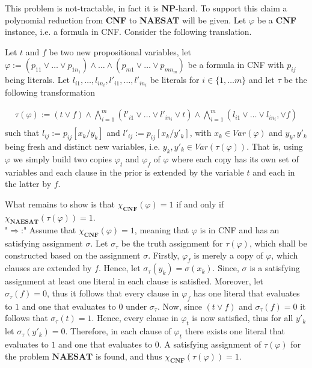 \documentclass[11pt,a4paper]{article}
\newcommand{\NP}{\ensuremath{\mathbf{NP}}\xspace}
\begin{document}
\begin{enumerate}
\begin{itemize}
        
        
This problem is not-tractable, in fact it is \NP-hard. To support this claim a polynomial reduction from \textbf{CNF} to \textbf{NAESAT} will be given. Let $\varphi$ be a \textbf{CNF} instance, i.e. a formula in CNF. Consider the following translation.  

Let $t$ and $f$ be two new propositional variables, let $\varphi:= (p_{11} \lor \dots \lor p_{1n_1}) \land \dots  \land (p_{m1} \lor \dots \lor p_{mn_m})  $ be a formula in CNF with $p_{ij}$ being literals. Let $l_{i1} , \dots , l_{in_i}, l'_{i1} , \dots , l'_{in_i}$ be literals for $i \in \{1, \dots m\}$ and let $\tau$ be the following transformation

\begin{equation*}
\begin{split}
\tau(\varphi) := (t \lor f) \land  \bigwedge_{i =1}^{m}  (l'_{i1} \lor \dots \lor l'_{in_i} \lor t)  \land \bigwedge_{i =1}^{m}    (l_{i1} \lor \dots \lor l_{in_i}, \lor f) \\
\end{split}
\end{equation*}
such that $l_{ij}:=p_{ij}[x_k/y_k]$ and $l'_{ij}:=p_{ij}[x_k/y'_k]$, with $x_k \in Var(\varphi)$ and $y_k, y'_k$ being fresh and distinct new variables, i.e. $y_k, y'_k \in \mathit{Var}(\tau(\varphi))$.
That is, using $\varphi$ we simply build two copies $\varphi_t$ and $\varphi_f$ of $\varphi$ where each copy has its own set of variables and each clause in the prior is extended by the variable $t$ and each in the latter by $f$.


What remains to show is that $\chi_{\textbf{CNF}}(\varphi) = 1$ if and only if $\chi_{\textbf{NAESAT}}(\tau(\varphi)) = 1$. \\

"$\Rightarrow$:" Assume that $\chi_{\textbf{CNF}}(\varphi) = 1$, meaning that $\varphi$ is in CNF and has an satisfying assignment $\sigma$. Let $\sigma_{\tau}$ be the truth assignment for $\tau(\varphi)$, which shall be constructed based on the assignment $\sigma$. 
Firstly, $\varphi_f$ is merely a copy of $\varphi$, which clauses are extended by $f$. Hence, let $\sigma_{\tau}(y_k)=\sigma(x_k)$. Since, $\sigma$ is a satisfying assignment at least one literal in each clause is  satisfied. Moreover, let $\sigma_{\tau}(f)=0$, thus it follows that every clause in $\varphi_f$ has one literal that evaluates to $1$  and one that evaluates to $0$ under $\sigma_{\tau}$. Now, since $(t \lor f)$ and $\sigma_{\tau}(f)=0$ it follows that $\sigma_{\tau}(t)=1$. Hence, every clause in $\varphi_t$ is now satisfied, thus for all $y'_k$ let $\sigma_{\tau}(y'_k)=0$. Therefore, in each clause of $\varphi_t$ there exists one literal that evaluates to $1$ and one that evaluates to $0$.
A satisfying assignment of $\tau(\varphi)$ for the problem $\textbf{NAESAT}$ is found, and thus $\chi_{\textbf{CNF}}(\tau(\varphi)) = 1$.


\end{itemize}
\end{enumerate}
\end{document}
